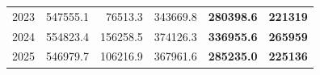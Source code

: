 \documentclass{report}
\begin{document}
\begin{table}[H]
{\begin{tabular}{c r r r r r}
            2023         & \num{547555.1}                          & \num{76513.3}                            & \num{343669.8}                           & \textbf{\num{280398.6}}          & \textbf{\num{221319}}                       \\
            2024         & \num{554823.4}                          & \num{156258.5}                           & \num{374126.3}                           & \textbf{\num{336955.6}}          & \textbf{\num{265959}}                       \\
            2025         & \num{546979.7}                          & \num{106216.9}                           & \num{367961.6}                           & \textbf{\num{285235.0}}          & \textbf{\num{225136}}                       \\
            \bottomrule
        \end{tabular}%
    }
    \label{tab:cna_historico}
\end{table}
\end{document}
